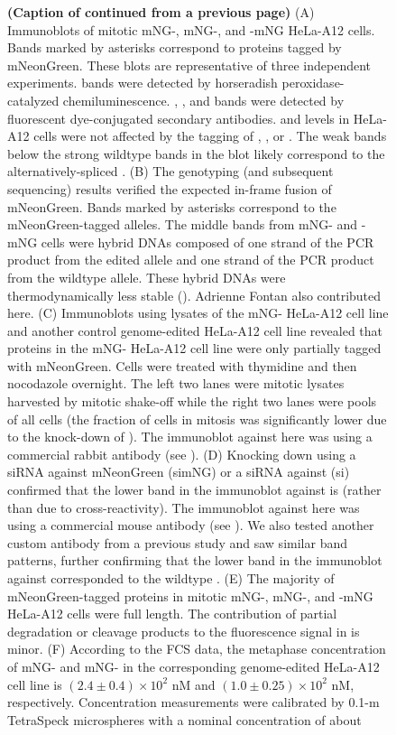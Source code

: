 \begin{figure}
    \noindent\justifying \textbf{(Caption of  continued from a previous page)} (A) Immunoblots of mitotic mNG-, mNG-, and -mNG HeLa-A12 cells. Bands marked by asterisks correspond to proteins tagged by mNeonGreen. These blots are representative of three independent experiments.  bands were detected by horseradish peroxidase-catalyzed chemiluminescence. , , and  bands were detected by fluorescent dye-conjugated secondary antibodies.  and  levels in HeLa-A12 cells were not affected by the  tagging of , , or . The weak bands below the strong wildtype bands in the  blot likely correspond to the alternatively-spliced  \cite{Mad1beta}. (B) The genotyping (and subsequent sequencing) results verified the expected in-frame fusion of mNeonGreen. Bands marked by asterisks correspond to the mNeonGreen-tagged alleles. The middle bands from mNG- and -mNG cells were hybrid DNAs composed of one strand of the PCR product from the edited allele and one strand of the PCR product from the wildtype allele. These hybrid DNAs were thermodynamically less stable (). Adrienne Fontan also contributed here. (C) Immunoblots using lysates of the mNG- HeLa-A12 cell line and another control genome-edited HeLa-A12 cell line revealed that  proteins in the mNG- HeLa-A12 cell line were only partially tagged with mNeonGreen. Cells were treated with thymidine and then nocodazole overnight. The left two lanes were mitotic lysates harvested by mitotic shake-off while the right two lanes were pools of all cells (the fraction of cells in mitosis was significantly lower due to the knock-down of ). The immunoblot against  here was using a commercial rabbit antibody (see ). (D) Knocking down  using a siRNA against mNeonGreen (simNG) or a siRNA against  (si) confirmed that the lower band in the immunoblot against  is  (rather than due to cross-reactivity). The immunoblot against  here was using a commercial mouse antibody (see ). We also tested another custom antibody from a previous study \cite{SheepAntiBUB1} and saw similar band patterns, further confirming that the lower band in the immunoblot against  corresponded to the wildtype . (E) The majority of mNeonGreen-tagged proteins in mitotic mNG-, mNG-, and -mNG HeLa-A12 cells were full length. The contribution of partial degradation or cleavage products to the fluorescence signal in  is minor. (F) According to the FCS data, the metaphase concentration of mNG- and mNG- in the corresponding genome-edited HeLa-A12 cell line is $(2.4 \pm 0.4) \times 10^2$ nM and $(1.0 \pm 0.25) \times 10^2$ nM, respectively. Concentration measurements were calibrated by 0.1-\textmu{}m TetraSpeck\texttrademark{} microspheres with a nominal concentration of about 
\end{figure}
